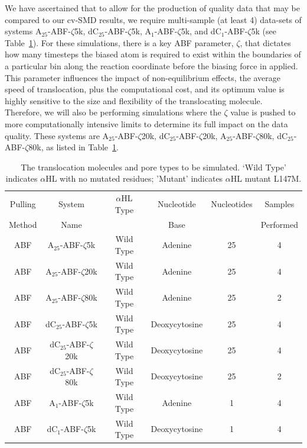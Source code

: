 \documentclass[a4paper,10pt]{article}
\newcommand{\dctfnsp}{dC$_{25}$}
\newcommand{\atfnsp}{A$_{25}$}
\newcommand{\dconsp}{dC$_{1}$}
\newcommand{\aonsp}{A$_{1}$}
\newcommand{\ahl}{$\alpha$HL }
\begin{document}
We have ascertained that to allow for the production of quality data that may be compared to our cv-SMD results, we require multi-sample (at least 4) data-sets of systems  \atfnsp-ABF-$\zeta$5k, \dctfnsp-ABF-$\zeta$5k,  \aonsp-ABF-$\zeta$5k,  and \dconsp-ABF-$\zeta$5k (see Table~\ref{table:systems2}). For these simulations, there is a key ABF parameter, $\zeta$, that dictates how many timesteps the biased atom is required to exist within the boundaries of a particular bin along the reaction coordinate before the biasing force in applied. This parameter influences the impact of non-equilibrium effects, the average speed of translocation, plus the computational cost, and its optimum value is highly sensitive to the size and flexibility of the translocating molecule. Therefore, we will also be performing simulations where the $\zeta$ value is pushed to more computationally intensive limits to determine its full impact on the data quality. These systems are \atfnsp-ABF-$\zeta$20k, \dctfnsp-ABF-$\zeta$20k,  \atfnsp-ABF-$\zeta$80k, \dctfnsp-ABF-$\zeta$80k, as listed in Table~\ref{table:systems2}.


\begin{table}[!h]
\begin{center}
  \caption{The translocation molecules and pore types to be simulated. `Wild Type' indicates \ahl with no mutated residues; 'Mutant' indicates \ahl mutant L147M.\newline }
\label{table:systems2}
\begin{tabular}{| c | c | c | c | c | c |}
\hline
Pulling & System & \ahl Type & Nucleotide & Nucleotides & Samples \\
Method & Name &  & Base &  & Performed \\
\hline
ABF & \atfnsp-ABF-$\zeta$5k & Wild Type & Adenine & 25 & 4  \\
ABF & \atfnsp-ABF-$\zeta$20k & Wild Type & Adenine & 25 & 4  \\
ABF & \atfnsp-ABF-$\zeta$80k & Wild Type & Adenine & 25 & 2  \\
ABF & \dctfnsp-ABF-$\zeta$5k & Wild Type & Deoxycytosine & 25 & 4  \\
ABF & \dctfnsp-ABF-$\zeta$20k & Wild Type & Deoxycytosine & 25 & 4  \\
ABF & \dctfnsp-ABF-$\zeta$80k & Wild Type & Deoxycytosine & 25 & 2 \\
ABF & \aonsp-ABF-$\zeta$5k & Wild Type & Adenine & 1 & 4  \\
ABF & \dconsp-ABF-$\zeta$5k & Wild Type & Deoxycytosine & 1 & 4  \\
\hline
\end{tabular}
\end{center}
\end{table}
\end{document}
